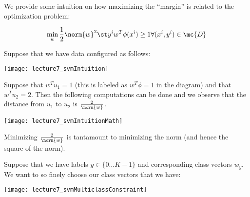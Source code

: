 \documentclass[../main.tex]{subfiles}
\begin{document}
\begin{example}
    We provide some intuition on how maximizing the ``margin'' is related to the
    optimization problem:

    \[
        \min_{w} \frac{1}{2}\norm{w}^2 \st y^{i}w^T\phi(x^{i}) \geq 1 \forall (x^{i},y^{i}) \in \mc{D}
    \]

    Suppose that we have data configured as follows:

    \begin{center}
        \texttt{[image: lecture7\_svmIntuition]}
    \end{center}

    Suppose that $w^Tu_1 = 1$ (this is labeled as $w^T\phi = 1$ in the diagram) and that $w^Tu_2 = 2$. Then the following computations can be done and we observe that the distance from $u_1$ to $u_2$ is $\frac{2}{\norm{w}}$.
    \begin{center}
        \texttt{[image: lecture7\_svmIntuitionMath]}
    \end{center}

    Minimizing $\frac{2}{\norm{w}}$ is tantamount to minimizing the norm (and hence the square of the norm).
\end{example}

\begin{definition}
    Suppose that we have labels $y \in \{0 \dots K-1\}$ and corresponding class vectors $w_{y}$. We want to so finely choose our class vectors that we have:

    \begin{center}
        \texttt{[image: lecture7\_svmMulticlassConstraint]}
    \end{center}
\end{definition}
\end{document}
